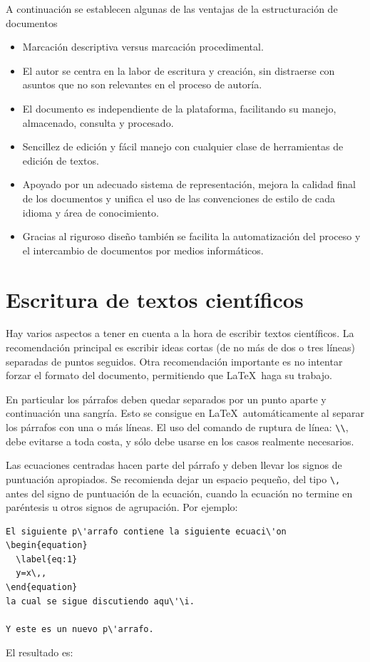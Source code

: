 \documentclass{article}
\begin{document}
A continuación se establecen algunas de las ventajas de la estructuración de documentos
  \begin{itemize}
  \item   Marcación descriptiva versus marcación procedimental.
  \item   El autor se centra en la labor de escritura y creación, sin distraerse con asuntos que no son relevantes en el proceso de autoría.
  \item  El documento es independiente de la plataforma, facilitando su manejo, almacenado, consulta y procesado.
  \item   Sencillez de edición y fácil manejo con cualquier clase de herramientas de edición de textos.
  \item   Apoyado por un adecuado sistema de representación, mejora la calidad final de los documentos y unifica el uso de las convenciones de estilo de cada idioma y área de conocimiento.
  \item   Gracias al riguroso diseño también se facilita la automatización del proceso y el intercambio de documentos por medios informáticos. 
  \end{itemize}
  
\section{Escritura de textos científicos}  
Hay varios aspectos a tener en cuenta a la hora de escribir textos científicos. La recomendación principal es escribir ideas cortas (de no más de dos o tres líneas) separadas de puntos seguidos. Otra recomendación importante es no intentar forzar el formato del documento, permitiendo que \LaTeX\ haga su trabajo.

En particular los párrafos deben quedar separados por un punto aparte y continuación una sangría.%
Esto se consigue en \LaTeX\ automáticamente al separar los párrafos con una o más líneas. El uso del comando de ruptura de línea: \verb|\\|, debe evitarse a toda costa, y sólo debe usarse en los casos realmente necesarios.  


Las ecuaciones centradas hacen parte del párrafo y deben llevar los signos de puntuación apropiados. Se recomienda dejar un espacio pequeño, del tipo \verb|\,| antes del signo de puntuación de la ecuación, cuando la ecuación no termine en paréntesis u otros signos de agrupación. Por ejemplo:
\begin{lstlisting}
El siguiente p\'arrafo contiene la siguiente ecuaci\'on
\begin{equation}
  \label{eq:1}
  y=x\,,
\end{equation}
la cual se sigue discutiendo aqu\'\i.

Y este es un nuevo p\'arrafo.
\end{lstlisting}
El resultado es:
\end{document}
